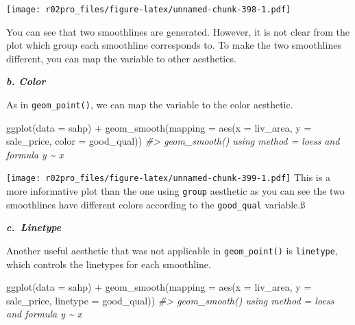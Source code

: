 \documentclass[
]{book}
\newenvironment{Shaded}{\begin{snugshade}}{\end{snugshade}}
\newcommand{\AttributeTok}[1]{\textcolor[rgb]{0.77,0.63,0.00}{#1}}
\newcommand{\CommentTok}[1]{\textcolor[rgb]{0.56,0.35,0.01}{\textit{#1}}}
\newcommand{\FunctionTok}[1]{\textcolor[rgb]{0.00,0.00,0.00}{#1}}
\newcommand{\NormalTok}[1]{#1}
\newcommand{\SpecialCharTok}[1]{\textcolor[rgb]{0.00,0.00,0.00}{#1}}
\begin{document}
\texttt{[image: r02pro\_files/figure-latex/unnamed-chunk-398-1.pdf]}

You can see that two smoothlines are generated. However, it is not clear from the plot which group each smoothline corresponds to. To make the two smoothlines different, you can map the variable to other aesthetics.

\textbf{\emph{b. Color}}

As in \texttt{geom\_point()}, we can map the variable to the color aesthetic.

\begin{Shaded}
\begin{Highlighting}[]
\FunctionTok{ggplot}\NormalTok{(}\AttributeTok{data =}\NormalTok{ sahp) }\SpecialCharTok{+} \FunctionTok{geom\_smooth}\NormalTok{(}\AttributeTok{mapping =} \FunctionTok{aes}\NormalTok{(}\AttributeTok{x =}\NormalTok{ liv\_area, }\AttributeTok{y =}\NormalTok{ sale\_price, }\AttributeTok{color =}\NormalTok{ good\_qual))}
\CommentTok{\#\textgreater{} \textasciigrave{}geom\_smooth()\textasciigrave{} using method = \textquotesingle{}loess\textquotesingle{} and formula \textquotesingle{}y \textasciitilde{} x\textquotesingle{}}
\end{Highlighting}
\end{Shaded}

\texttt{[image: r02pro\_files/figure-latex/unnamed-chunk-399-1.pdf]}
This is a more informative plot than the one using \texttt{group} aesthetic as you can see the two smoothlines have different colors according to the \texttt{good\_qual} variable.ß

\textbf{\emph{c.~Linetype}}

Another useful aesthetic that was not applicable in \texttt{geom\_point()} is \texttt{linetype}, which controls the linetypes for each smoothline.

\begin{Shaded}
\begin{Highlighting}[]
\FunctionTok{ggplot}\NormalTok{(}\AttributeTok{data =}\NormalTok{ sahp) }\SpecialCharTok{+} \FunctionTok{geom\_smooth}\NormalTok{(}\AttributeTok{mapping =} \FunctionTok{aes}\NormalTok{(}\AttributeTok{x =}\NormalTok{ liv\_area, }\AttributeTok{y =}\NormalTok{ sale\_price, }\AttributeTok{linetype =}\NormalTok{ good\_qual))}
\CommentTok{\#\textgreater{} \textasciigrave{}geom\_smooth()\textasciigrave{} using method = \textquotesingle{}loess\textquotesingle{} and formula \textquotesingle{}y \textasciitilde{} x\textquotesingle{}}
\end{Highlighting}
\end{Shaded}
\end{document}
